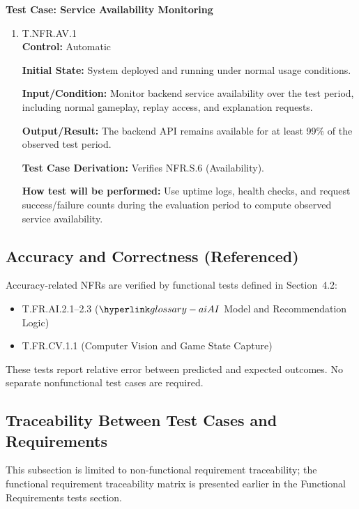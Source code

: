 \documentclass[12pt, titlepage]{article}
\begin{document}
\textbf{Test Case: Service Availability Monitoring}

\begin{enumerate}
\item{\hypertarget{T.NFR.AV.1}{T.NFR.AV.1}\\}
\textbf{Control:} Automatic

\textbf{Initial State:} System deployed and running under normal usage conditions.

\textbf{Input/Condition:} Monitor backend service availability over the test period,
including normal gameplay, replay access, and explanation requests.

\textbf{Output/Result:} The backend API remains available for at least 99\% of the
observed test period.

\textbf{Test Case Derivation:} Verifies NFR.S.6 (Availability).

\textbf{How test will be performed:} Use uptime logs, health checks, and request
success/failure counts during the evaluation period to compute observed service availability.
\end{enumerate}

\subsection{Accuracy and Correctness (Referenced)}

Accuracy-related NFRs are verified by functional tests defined in Section~4.2:
\begin{itemize}
    \item T.FR.AI.2.1--2.3 ($\AI{}$ Model and Recommendation Logic)
    \item T.FR.CV.1.1 (Computer Vision and Game State Capture)
\end{itemize}
These tests report relative error between predicted and expected outcomes. No separate nonfunctional test cases are required.

\subsection{Traceability Between Test Cases and Requirements }

This subsection is limited to non-functional requirement traceability; the functional requirement traceability matrix is presented earlier in the Functional Requirements tests section.
\end{document}
